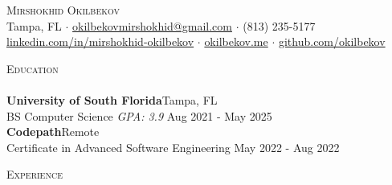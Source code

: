 \documentclass[a4paper]{article}
\newcommand{\lineunder} {
    \vspace*{-8pt} \\
    \hspace*{-18pt} \hrulefill \\
}
\newcommand{\header} [1] {
    {\hspace*{-18pt}\vspace*{6pt} \textsc{#1}}
    \vspace*{-6pt} \lineunder
}
\begin{document}
\vspace*{-40pt}

    

\vspace*{-10pt}
\begin{center}
	{\Huge \scshape {Mirshokhid Okilbekov}}\\
	Tampa, FL $\cdot$ \href{mailto:okilbekovmirshokhid@gmail.com}{okilbekovmirshokhid@gmail.com} $\cdot$ (813) 235-5177 \\ \href{https://linkedin.com/in/mirshokhid-okilbekov}{linkedin.com/in/mirshokhid-okilbekov} $\cdot$ \href{https://okilbekov.me}{okilbekov.me} $\cdot$ \href{https://github.com/okilbekov}{github.com/okilbekov} \\
\end{center}

{\Large \header{Education}}
\textbf{University of South Florida}\hfill Tampa, FL\\
BS Computer Science \textit{GPA: 3.9} \hfill Aug 2021 - May 2025\\
\vspace{2mm}
\textbf{Codepath}\hfill Remote\\
Certificate in Advanced Software Engineering \hfill May 2022 - Aug 2022\\
\vspace{1mm}

{\Large \header{Experience}}
\end{document}
